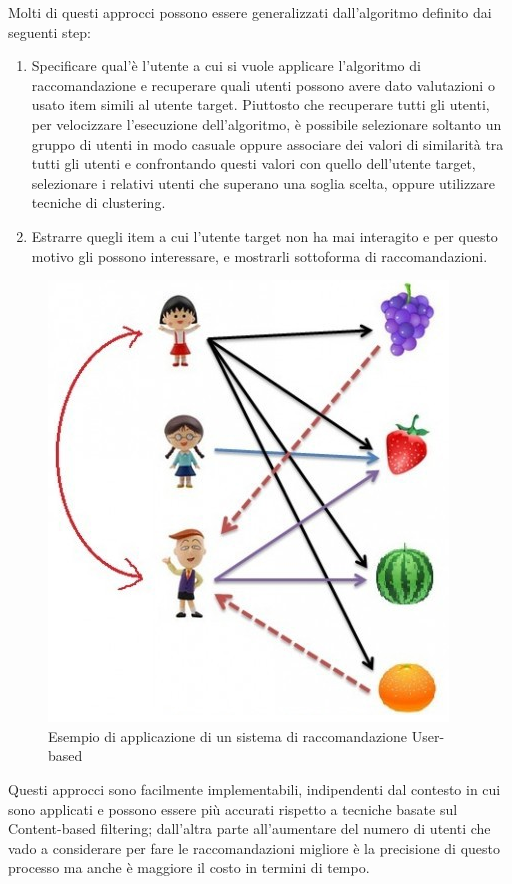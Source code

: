Molti di questi approcci possono essere generalizzati dall'algoritmo definito dai seguenti step:
\begin{enumerate}
	\item Specificare qual'è l'utente a cui si vuole applicare l'algoritmo di raccomandazione e recuperare quali utenti possono 
	avere dato valutazioni o usato item simili al utente target. Piuttosto che recuperare tutti gli utenti, per velocizzare l'esecuzione
	dell'algoritmo, è possibile selezionare soltanto un gruppo di utenti in modo casuale oppure associare dei valori di similarità tra 
	tutti gli utenti e confrontando questi valori con quello dell'utente target, selezionare i relativi utenti che superano una soglia
	scelta, oppure utilizzare tecniche di clustering.
	\item Estrarre quegli item a cui l'utente target non ha mai interagito e per questo motivo gli possono interessare, e mostrarli 
	sottoforma di raccomandazioni.
\end{enumerate}

\begin{figure}[ht!]
	\centering
	\includegraphics[scale=0.5]{images/UB_CF_ex.PNG}
	\caption{Esempio di applicazione di un sistema di raccomandazione User-based}
	\label{fig:UB_CF}
\end{figure}

Questi approcci sono facilmente implementabili, indipendenti dal contesto in cui sono applicati e possono essere più accurati rispetto
a tecniche basate sul Content-based filtering; dall'altra parte all'aumentare del numero di utenti che vado a considerare per fare le 
raccomandazioni migliore è la precisione di questo processo ma anche è maggiore il costo in termini di tempo.  


